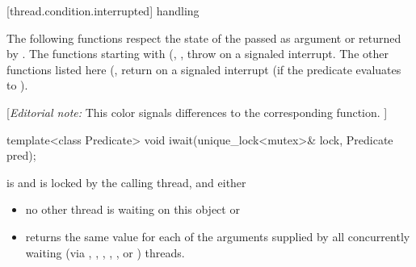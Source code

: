 






{\color{insertcolor}

[thread.condition.interrupted]{ handling}

The following functions respect the state of the 
passed as argument or returned by .
The functions starting with 
(, , 
throw  on a signaled interrupt.
The other functions listed here
(, 
return  on a signaled interrupt
(if the predicate evaluates to ). 


{\color{blue}
[{\itshape{}Editorial note:} {\color{diffcolor}This color signals differences to the corresponding  function.} ]
}

%
\begin{itemdecl}
template<class Predicate>
  void iwait(unique_lock<mutex>& lock, Predicate pred);
\end{itemdecl}
\begin{itemdescr}
 \pnum \requires {} is  and  is
        locked by the calling thread, and either

        \begin{itemize}
         \item no other thread is waiting on this  object or
         \item {} returns the same value for each of the 
                arguments supplied by all concurrently waiting (via ,
                , 
                {\color{insertcolor}, , , or }) threads.
        \end{itemize}


\end{itemdescr}}
